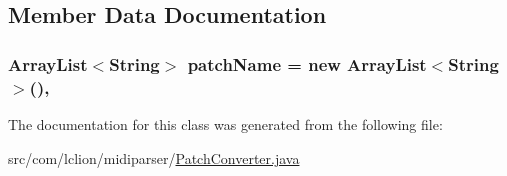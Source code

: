 \subsection{Member Data Documentation}
\hypertarget{classcom_1_1lclion_1_1midiparser_1_1_patch_converter_a62653567f7df39fd70881a4e4c6b6047}{
\subsubsection[{patch\+Name}]{\setlength{\rightskip}{0pt plus 5cm}Array\+List$<$String$>$ patch\+Name = new Array\+List$<$String$>$()\hspace{0.3cm}{\ttfamily [static]}, {\ttfamily [private]}}}\label{classcom_1_1lclion_1_1midiparser_1_1_patch_converter_a62653567f7df39fd70881a4e4c6b6047}


The documentation for this class was generated from the following file\+:\begin{DoxyCompactItemize}
\item 
src/com/lclion/midiparser/\hyperlink{_patch_converter_8java}{Patch\+Converter.\+java}\end{DoxyCompactItemize}

